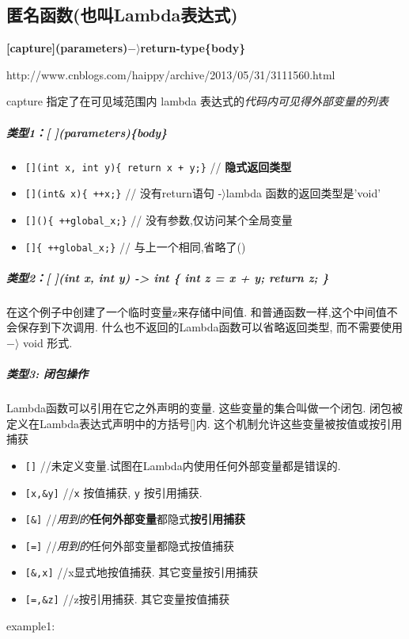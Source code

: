\documentclass[UTF8,a4paper,12pt]{ctexbook} %
\begin{document}
		\subsection{匿名函数(也叫Lambda表达式)}
		
			\textbf{	[capture](parameters)$- \rangle$return-type\{body\}}
			
			http://www.cnblogs.com/haippy/archive/2013/05/31/3111560.html
			
			capture 指定了在可见域范围内 lambda 表达式的\textit{代码内可见得外部变量的列表}
			
			\subparagraph{类型1：[ ](parameters)\{body\}}
			\begin{itemize}
				\item  \verb|[](int x, int y){ return x + y;}| // \textbf{隐式返回类型}
				\item  \verb|[](int& x){ ++x;}|   // 没有return语句 -$\rangle$lambda 函数的返回类型是'void'
				\item  \verb|[](){ ++global_x;}|  // 没有参数,仅访问某个全局变量
				\item  \verb|[]{ ++global_x;}|     // 与上一个相同,省略了()
			\end{itemize}
			
			\subparagraph{类型2：[ ](int x, int y) -> int \{ int z = x + y; return z; \}}在这个例子中创建了一个临时变量z来存储中间值. 和普通函数一样,这个中间值不会保存到下次调用. 什么也不返回的Lambda函数可以省略返回类型, 而不需要使用 $- \rangle$ void 形式.
			
			\subparagraph{类型3: 闭包操作}Lambda函数可以引用在它之外声明的变量. 这些变量的集合叫做一个闭包. 闭包被定义在Lambda表达式声明中的方括号[]内. 这个机制允许这些变量被按值或按引用捕获
			\begin{itemize}
				\item \verb|[]|  //未定义变量.试图在Lambda内使用任何外部变量都是错误的.
				\item \verb|[x,&y]| //\verb|x| 按值捕获, \verb|y| 按引用捕获.
				\item \verb|[&]|  //\textit{用到的}\textbf{任何外部变量}都隐式\textbf{按引用捕获}
				\item \verb|[=]|  //\textit{用到的}任何外部变量都隐式按值捕获
				\item \verb|[&,x]| //x显式地按值捕获. 其它变量按引用捕获
				\item \verb|[=,&z]| //z按引用捕获. 其它变量按值捕获
			\end{itemize}
			
			example1:
			
\end{document}

